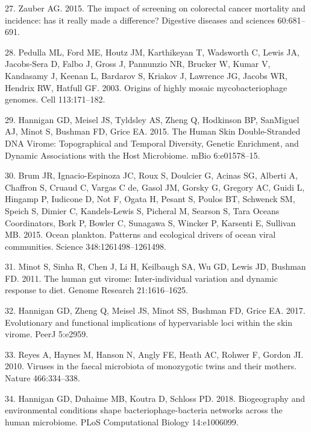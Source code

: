 \documentclass[12pt,]{article}
\begin{document}
\hypertarget{ref-Zauber:2015cr}{}
27. Zauber AG. 2015. The impact of screening on colorectal cancer
mortality and incidence: has it really made a difference? Digestive
diseases and sciences 60:681--691.

\hypertarget{ref-Pedulla:2003tu}{}
28. Pedulla ML, Ford ME, Houtz JM, Karthikeyan T, Wadsworth C, Lewis JA,
Jacobs-Sera D, Falbo J, Gross J, Pannunzio NR, Brucker W, Kumar V,
Kandasamy J, Keenan L, Bardarov S, Kriakov J, Lawrence JG, Jacobs WR,
Hendrix RW, Hatfull GF. 2003. Origins of highly mosaic mycobacteriophage
genomes. Cell 113:171--182.

\hypertarget{ref-Hannigan:2015fz}{}
29. Hannigan GD, Meisel JS, Tyldsley AS, Zheng Q, Hodkinson BP,
SanMiguel AJ, Minot S, Bushman FD, Grice EA. 2015. The Human Skin
Double-Stranded DNA Virome: Topographical and Temporal Diversity,
Genetic Enrichment, and Dynamic Associations with the Host Microbiome.
mBio 6:e01578--15.

\hypertarget{ref-Brum:2015iaa}{}
30. Brum JR, Ignacio-Espinoza JC, Roux S, Doulcier G, Acinas SG, Alberti
A, Chaffron S, Cruaud C, Vargas C de, Gasol JM, Gorsky G, Gregory AC,
Guidi L, Hingamp P, Iudicone D, Not F, Ogata H, Pesant S, Poulos BT,
Schwenck SM, Speich S, Dimier C, Kandels-Lewis S, Picheral M, Searson S,
Tara Oceans Coordinators, Bork P, Bowler C, Sunagawa S, Wincker P,
Karsenti E, Sullivan MB. 2015. Ocean plankton. Patterns and ecological
drivers of ocean viral communities. Science 348:1261498--1261498.

\hypertarget{ref-Minot:2011ez}{}
31. Minot S, Sinha R, Chen J, Li H, Keilbaugh SA, Wu GD, Lewis JD,
Bushman FD. 2011. The human gut virome: Inter-individual variation and
dynamic response to diet. Genome Research 21:1616--1625.

\hypertarget{ref-Hannigan:2017ky}{}
32. Hannigan GD, Zheng Q, Meisel JS, Minot SS, Bushman FD, Grice EA.
2017. Evolutionary and functional implications of hypervariable loci
within the skin virome. PeerJ 5:e2959.

\hypertarget{ref-Reyes:2010cwa}{}
33. Reyes A, Haynes M, Hanson N, Angly FE, Heath AC, Rohwer F, Gordon
JI. 2010. Viruses in the faecal microbiota of monozygotic twins and
their mothers. Nature 466:334--338.

\hypertarget{ref-Hannigan:2018gv}{}
34. Hannigan GD, Duhaime MB, Koutra D, Schloss PD. 2018. Biogeography
and environmental conditions shape bacteriophage-bacteria networks
across the human microbiome. PLoS Computational Biology 14:e1006099.
\end{document}
